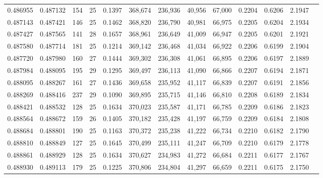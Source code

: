 \begin{tabular}{rrrrrrrrrrrrr}
0.486955 & 0.487132 &    154 &    25 &                                     0.1397 & 368,674 & 236,936 &  40,956 &  67,000 & 0.2204 & 0.6206 & 2.1947 \\
0.487143 & 0.487421 &    146 &    25 &                                     0.1462 & 368,820 & 236,790 &  40,981 &  66,975 & 0.2205 & 0.6204 & 2.1934 \\
0.487427 & 0.487565 &    141 &    28 &                                     0.1657 & 368,961 & 236,649 &  41,009 &  66,947 & 0.2205 & 0.6201 & 2.1921 \\
0.487580 & 0.487714 &    181 &    25 &                                     0.1214 & 369,142 & 236,468 &  41,034 &  66,922 & 0.2206 & 0.6199 & 2.1904 \\
0.487720 & 0.487980 &    160 &    27 &                                     0.1444 & 369,302 & 236,308 &  41,061 &  66,895 & 0.2206 & 0.6197 & 2.1889 \\
0.487984 & 0.488095 &    195 &    29 &                                     0.1295 & 369,497 & 236,113 &  41,090 &  66,866 & 0.2207 & 0.6194 & 2.1871 \\
0.488095 & 0.488267 &    161 &    27 &                                     0.1436 & 369,658 & 235,952 &  41,117 &  66,839 & 0.2207 & 0.6191 & 2.1856 \\
0.488269 & 0.488416 &    237 &    29 &                                     0.1090 & 369,895 & 235,715 &  41,146 &  66,810 & 0.2208 & 0.6189 & 2.1834 \\
0.488421 & 0.488532 &    128 &    25 &                                     0.1634 & 370,023 & 235,587 &  41,171 &  66,785 & 0.2209 & 0.6186 & 2.1823 \\
0.488564 & 0.488672 &    159 &    26 &                                     0.1405 & 370,182 & 235,428 &  41,197 &  66,759 & 0.2209 & 0.6184 & 2.1808 \\
0.488684 & 0.488801 &    190 &    25 &                                     0.1163 & 370,372 & 235,238 &  41,222 &  66,734 & 0.2210 & 0.6182 & 2.1790 \\
0.488810 & 0.488849 &    127 &    25 &                                     0.1645 & 370,499 & 235,111 &  41,247 &  66,709 & 0.2210 & 0.6179 & 2.1778 \\
0.488861 & 0.488929 &    128 &    25 &                                     0.1634 & 370,627 & 234,983 &  41,272 &  66,684 & 0.2211 & 0.6177 & 2.1767 \\
0.488930 & 0.489113 &    179 &    25 &                                     0.1225 & 370,806 & 234,804 &  41,297 &  66,659 & 0.2211 & 0.6175 & 2.1750 \\

\end{tabular}
